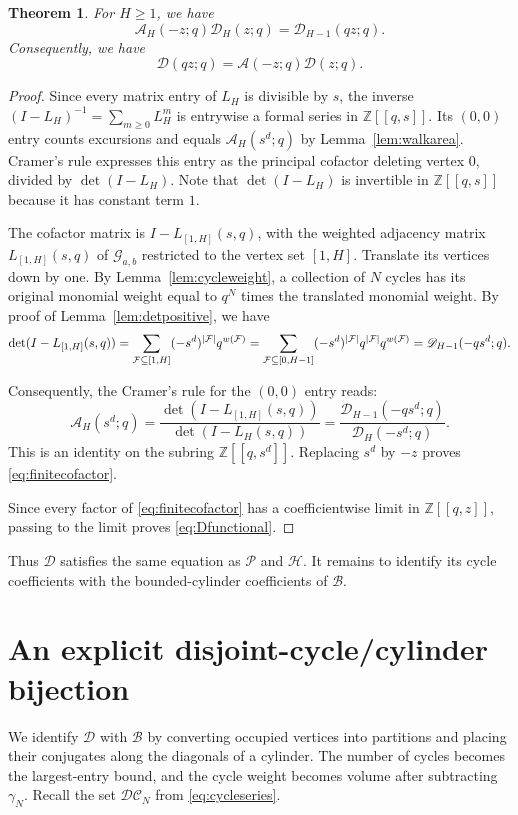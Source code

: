 \documentclass[12pt,reqno]{amsart}
\numberwithin{equation}{section}
\newtheorem{theorem}{Theorem}[section]
\theoremstyle{definition}
\theoremstyle{remark}
\theoremstyle{plain}
\newcommand{\ZZ}{\mathbb Z}
\DeclarePairedDelimiter\abs{\lvert}{\rvert}
\newcommand{\Hseries}{\mathscr H}
\newcommand{\Aseries}{\mathscr A}
\newcommand{\Dseries}{\mathscr D}
\newcommand{\Bseries}{\mathscr B}
\newcommand{\Pseries}{\mathscr P}
\newcommand{\Ggraph}{\mathcal G_{a,b}}
\begin{document}
\begin{theorem}\label{thm:cofactor}
For $H\ge1$, we have
\begin{equation}\label{eq:finitecofactor}
 \Aseries_H(-z;q)\Dseries_H(z;q)=\Dseries_{H-1}(qz;q).
\end{equation}
Consequently, we have
\begin{equation}\label{eq:Dfunctional}
 \Dseries(qz;q)=\Aseries(-z;q)\Dseries(z;q).
\end{equation}
\end{theorem}
\begin{proof}
Since every matrix entry of $L_H$ is divisible by $s$, the inverse
$(I-L_H)^{-1}=\sum_{m\ge0}L_H^m$ is entrywise a formal series in $\ZZ[[q,s]]$.
Its $(0,0)$ entry counts excursions and equals
$\Aseries_H(s^d;q)$ by Lemma~\ref{lem:walkarea}.
Cramer's rule expresses this entry as the principal cofactor deleting
vertex $0$, divided by $\det(I-L_H)$. Note that $\det(I-L_H)$ is invertible in $\ZZ[[q,s]]$ because it has constant term $1$.

The cofactor matrix is $I-L_{[1,H]}(s,q)$, with the weighted adjacency matrix $L_{[1,H]}(s,q)$ of $\Ggraph$ restricted to the vertex set $[1,H]$.
Translate its vertices down by one.
By Lemma~\ref{lem:cycleweight}, a collection of $N$ cycles has its
original monomial weight equal to $q^N$ times the translated monomial weight. By proof of Lemma~\ref{lem:detpositive}, we have
\[ \det(I-L_{[1,H]}(s,q))=\sum_{\mathcal F\subseteq [1,H]} (-s^d)^{\abs{\mathcal F}}q^{w(\mathcal{F})}=\sum_{\mathcal F\subseteq [0,H-1]} (-s^d)^{\abs{\mathcal F}}q^{\abs{\mathcal F}}q^{w(\mathcal{F})}=\Dseries_{H-1}(-qs^d;q).\]

Consequently, the Cramer's rule for the $(0,0)$ entry reads:
\[ \Aseries_H(s^d;q)=\frac{\det(I-L_{[1,H]}(s,q))}{\det(I-L_H(s,q))}=\frac{\Dseries_{H-1}(-qs^d;q)}{\Dseries_H(-s^d;q)}.\]
This is an identity on the subring $\ZZ[[q,s^d]]$.
Replacing $s^d$ by $-z$ proves \eqref{eq:finitecofactor}.

Since every factor of \eqref{eq:finitecofactor} has a coefficientwise limit in $\ZZ[[q,z]]$, passing to the limit proves \eqref{eq:Dfunctional}.
\end{proof}
Thus $\Dseries$ satisfies the same equation as $\Pseries$ and $\Hseries$.
It remains to identify its cycle coefficients with the bounded-cylinder
coefficients of $\Bseries$.


\section{An explicit disjoint-cycle/cylinder bijection}\label{sec:bijection}
We identify $\Dseries$ with $\Bseries$ by converting occupied vertices
into partitions and placing their conjugates along the diagonals of a
cylinder.  The number of cycles becomes the largest-entry bound, and
the cycle weight becomes volume after subtracting $\gamma_N$. Recall the set $\mathcal{DC}_N$ from \eqref{eq:cycleseries}.
\end{document}

